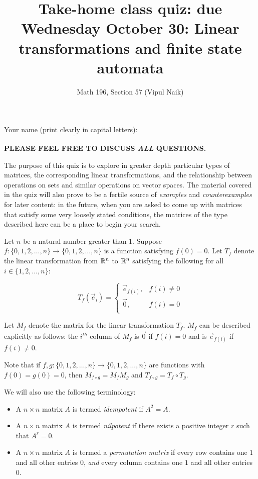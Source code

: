 \documentclass[10pt]{amsart}
\title{Take-home class quiz: due Wednesday October 30: Linear transformations and finite state automata}
\author{Math 196, Section 57 (Vipul Naik)}
\begin{document}
\maketitle

Your name (print clearly in capital letters): $\underline{\qquad\qquad\qquad\qquad\qquad\qquad\qquad\qquad\qquad\qquad}$

{\bf PLEASE FEEL FREE TO DISCUSS {\em ALL} QUESTIONS.}

The purpose of this quiz is to explore in greater depth particular
types of matrices, the corresponding linear transformations, and the
relationship between operations on sets and similar operations on
vector spaces. The material covered in the quiz will also prove to be
a fertile source of {\em examples} and {\em counterexamples} for later
content: in the future, when you are asked to come up with matrices
that satisfy some very loosely stated conditions, the matrices of the
type described here can be a place to begin your search.

\vspace{0.2in}

Let $n$ be a natural number greater than $1$. Suppose $f: \{
0,1,2,\dots,n\} \to \{ 0,1,2,\dots,n\}$ is a function satisfying $f(0)
= 0$. Let $T_f$ denote the linear transformation from $\mathbb{R}^n$ to $\mathbb{R}^n$
satisfying the following for all $i \in \{ 1,2,\dots,n\}$:

$$T_f(\vec{e}_i) = \left \lbrace \begin{array}{rl} \vec{e}_{f(i)}, & f(i) \ne 0\\ \vec{0}, & f(i) = 0\\\end{array}\right.$$

Let $M_f$ denote the matrix for the linear transformation $T_f$. $M_f$
can be described explicitly as follows: the $i^{th}$ column of $M_f$
is $\vec{0}$ if $f(i) = 0$ and is $\vec{e}_{f(i)}$ if $f(i) \ne 0$.

Note that if $f,g: \{ 0,1,2,\dots,n \} \to \{ 0,1,2,\dots,n\}$ are
functions with $f(0)= g(0) = 0$, then $M_{f \circ g} = M_fM_g$ and
$T_{f \circ g} = T_f \circ T_g$.

We will also use the following terminology:

\begin{itemize}
\item A $n \times n$ matrix $A$ is termed {\em idempotent} if $A^2 = A$.
\item A $n \times n$ matrix $A$ is termed {\em nilpotent} if there
  exists a positive integer $r$ such that $A^r = 0$.
\item A $n \times n$ matrix $A$ is termed a {\em permutation matrix}
  if every row contains one $1$ and all other entries $0$, {\em and}
  every column contains one $1$ and all other entries $0$.
\end{itemize}
\end{document}
